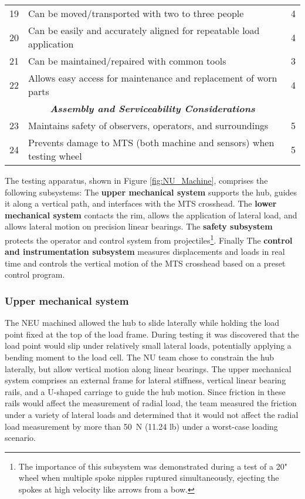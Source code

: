 \documentclass[\rootdir/thesis.tex]{subfiles}
\begin{document}
\begin{table}
\begin{tabularx}{\linewidth}{r|Xc}
\hline
19& Can be moved/transported with two to three people& 4\\
20& Can be easily and accurately aligned for repeatable load application& 4\\
21& Can be maintained/repaired with common tools& 3\\
22& Allows easy access for maintenance and replacement of worn parts& 4\\
\hline
\multicolumn{3}{c}{\emph{\textbf{Assembly and Serviceability Considerations}}}\\
\hline
23& Maintains safety of observers, operators, and surroundings& 5\\
24& Prevents damage to MTS (both machine and sensors) when testing wheel& 5\\
\hline
\end{tabularx}
\end{table}

The testing apparatus, shown in Figure \ref{fig:NU_Machine}, comprises the following subsystems: The \textbf{upper mechanical system} supports the hub, guides it along a vertical path, and interfaces with the MTS crosshead. The \textbf{lower mechanical system} contacts the rim, allows the application of lateral load, and allows lateral motion on precision linear bearings. The \textbf{safety subsystem} protects the operator and control system from projectiles\footnote{The importance of this subsystem was demonstrated during a test of a 20" wheel when multiple spoke nipples ruptured simultaneously, ejecting the spokes at high velocity like arrows from a bow.}. Finally The \textbf{control and instrumentation subsystem} measures displacements and loads in real time and controls the vertical motion of the MTS crosshead based on a preset control program.

\subsubsection*{Upper mechanical system}

The NEU machined allowed the hub to slide laterally while holding the load point fixed at the top of the load frame. During testing it was discovered that the load point would slip under relatively small lateral loads, potentially applying a bending moment to the load cell. The NU team chose to constrain the hub laterally, but allow vertical motion along linear bearings. The upper mechanical system comprises an external frame for lateral stiffness, vertical linear bearing rails, and a U-shaped carriage to guide the hub motion. Since friction in these rails would affect the measurement of radial load, the team measured the friction under a variety of lateral loads and determined that it would not affect the radial load measurement by more than \SI{50}{\newton} (11.24 lb) under a worst-case loading scenario.
\end{document}
